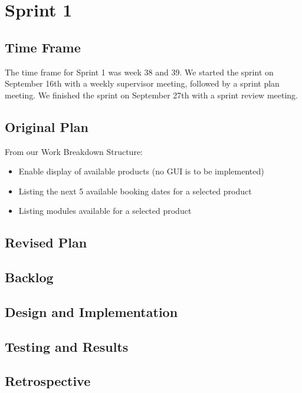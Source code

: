 \section{Sprint 1}
\subsection{Time Frame}
The time frame for Sprint 1 was week 38 and 39. We started the sprint on September 16th with a weekly supervisor meeting, followed by a sprint plan meeting. We finished the sprint on September 27th with a sprint review meeting.
\subsection{Original Plan}
From our Work Breakdown Structure:
\begin{itemize}
	\item Enable display of available products (no GUI is to be implemented)
	\item Listing the next 5 available booking dates for a selected product
	\item Listing modules available for a selected product
\end{itemize}
\subsection{Revised Plan}
\subsection{Backlog}
\subsection{Design and Implementation}
\subsection{Testing and Results}
\subsection{Retrospective}
